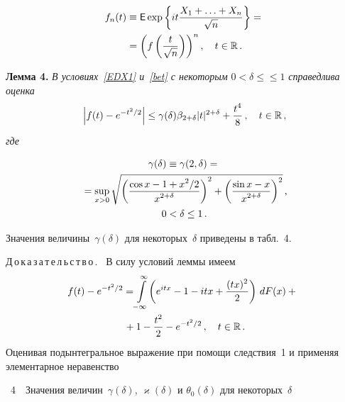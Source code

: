\begin{multicols}{2}
\noindent
\begin{multline*}
f_n(t)\equiv{\sf E}\exp\left\{it\displaystyle\frac{\displaystyle X_1+\ldots+X_n\mathstrut}{\displaystyle \sqrt{n}\mathstrut}\right\}={}\\
{}=
\left(f\left(\displaystyle\frac{\displaystyle t\mathstrut}{\displaystyle \sqrt n\mathstrut}\right)\right)^n,\quad t\in\mathbb R\,.
\end{multline*}

\smallskip

\noindent
\textbf{Лемма 4.} \textit{В условиях~\eqref{EDX1} и~\eqref{bet} с некоторым} $0<\delta\le$\linebreak $\le 1$
\textit{справедлива оценка}
$$
\left|f(t)-e^{-t^2/2}\right|\le \gamma(\delta)\beta_{2+\delta}|t|^{2+\delta}+\displaystyle\frac{\displaystyle t^4\mathstrut}{\displaystyle 8\mathstrut}\,, \quad
t\in\mathbb R\,,
$$
\textit{где}
\vspace*{-2pt}

\noindent
\begin{multline*}
\gamma(\delta)\equiv\gamma(2,\delta)={}\\
{}= \sup_{x>0}\sqrt{\left(\displaystyle\frac{\displaystyle \cos
x-1+x^2/2\mathstrut}{\displaystyle x^{2+\delta}\mathstrut}\right)^2 + \left(\displaystyle\frac{\displaystyle \sin
x-x\mathstrut}{\displaystyle x^{2+\delta}\mathstrut}\right)^2 }\,,\\
 0<\delta\le1\,.
\end{multline*}

\smallskip

Значения величины~$\gamma(\delta)$ для некоторых~$\delta$ приведены в
табл.~4.


\smallskip

\noindent
Д\,о\,к\,а\,з\,а\,т\,е\,л\,ь\,с\,т\,в\,о\,. \
В силу условий леммы имеем
\begin{multline*}
\!\!f(t)-e^{-t^2/2}= \!\int\limits_{-\infty}^\infty\!\left(e^{itx}-1-itx+
\displaystyle\frac{\displaystyle (tx)^2\mathstrut}{\displaystyle 2\mathstrut}\right)\,dF(x)+{}\\
{}+1-\displaystyle\frac{\displaystyle t^2\mathstrut}{\displaystyle 2\mathstrut}-e^{-t^2/2}\,,\quad
t\in\mathbb R\,.
\end{multline*}
Оценивая подынтегральное выражение при помощи
следствия~1 и применяя элементарное неравенство
\pagebreak

\noindent %
\begin{center}
\parbox{74mm}{{\tablename~4}\ \ \small{Значения величин~$\gamma(\delta)$, $\varkappa(\delta)$
и $\theta_0(\delta)$
для некоторых~$\delta$}}
\end{center}


\end{multicols}
